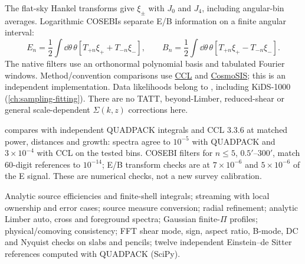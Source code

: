 The flat-sky Hankel transforms give $\xi_\pm$ with $J_0$ and $J_4$, including angular-bin averages.
Logarithmic COSEBIs \cite{Schneider2010,Asgari2021} separate E/B information on a finite angular interval:
\begin{equation}
E_n=\frac12\int\dd\theta\,\theta[T_{+n}\xi_++T_{-n}\xi_-],\qquad
B_n=\frac12\int\dd\theta\,\theta[T_{+n}\xi_+-T_{-n}\xi_-].
\end{equation}
The native filters use an orthonormal polynomial basis and tabulated Fourier windows.
Method/convention comparisons use \href{https://github.com/LSSTDESC/CCL}{CCL} and
\href{https://github.com/joezuntz/cosmosis-standard-library}{CosmoSIS}; this is an independent implementation.
Data likelihoods belong to , including KiDS-1000 (\cref{ch:sampling-fitting}).
There are no TATT, beyond-Limber, reduced-shear or general scale-dependent $\Sigma(k,z)$ corrections here.

\begin{validation}
 compares with independent QUADPACK integrals and CCL 3.3.6 at matched power,
distances and growth: spectra agree to $10^{-5}$ with QUADPACK and $3\times10^{-4}$ with CCL on the tested bins.
COSEBI filters for $n\le5$, $0.5'$--$300'$, match 60-digit references to $10^{-14}$; E/B transform checks are
at $7\times10^{-6}$ and $5\times10^{-6}$ of the E signal. These are numerical checks, not a new survey calibration.
\end{validation}

\begin{validation}
Analytic source efficiencies and finite-shell integrals; streaming with local ownership and error cases; source measure conversion; radial refinement; analytic
Limber auto, cross and foreground spectra; Gaussian finite-$\Pi$ profiles; physical/comoving consistency; FFT shear mode, sign, aspect ratio, B-mode, DC and Nyquist
checks on slabs and pencils; twelve independent Einstein--de Sitter references computed with QUADPACK (SciPy).
\end{validation}
